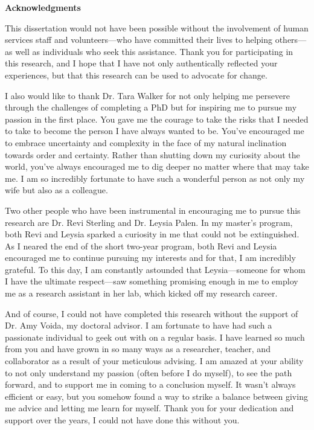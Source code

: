 \documentclass[11pt,openany,oneside]{book}
\begin{document}
\thispagestyle{plain}
{\Large \noindent \textbf{Acknowledgments} \par} \vspace{.5cm}
This dissertation would not have been possible without the involvement of human services staff and volunteers---who have committed their lives to helping others---as well as individuals who seek this assistance. Thank you for participating in this research, and I hope that I have not only authentically reflected your experiences, but that this research can be used to advocate for change.

I also would like to thank Dr. Tara Walker for not only helping me persevere through the challenges of completing a PhD but for inspiring me to pursue my passion in the first place. You gave me the courage to take the risks that I needed to take to become the person I have always wanted to be. You've encouraged me to embrace uncertainty and complexity in the face of my natural inclination towards order and certainty. Rather than shutting down my curiosity about the world, you've always encouraged me to dig deeper no matter where that may take me. I am so incredibly fortunate to have such a wonderful person as not only my wife but also as a colleague.

Two other people who have been instrumental in encouraging me to pursue this research are Dr. Revi Sterling and Dr. Leysia Palen. In my master's program, both Revi and Leysia sparked a curiosity in me that could not be extinguished. As I neared the end of the short two-year program, both Revi and Leysia encouraged me to continue pursuing my interests and for that, I am incredibly grateful. To this day, I am constantly astounded that Leysia---someone for whom I have the ultimate respect---saw something promising enough in me to employ me as a research assistant in her lab, which kicked off my research career.

And of course, I could not have completed this research without the support of Dr. Amy Voida, my doctoral advisor. I am fortunate to have had such a passionate individual to geek out with on a regular basis. I have learned so much from you and have grown in so many ways as a researcher, teacher, and collaborator as a result of your meticulous advising. I am amazed at your ability to not only understand my passion (often before I do myself), to see the path forward, and to support me in coming to a conclusion myself. It wasn't always efficient or easy, but you somehow found a way to strike a balance between giving me advice and letting me learn for myself. Thank you for your dedication and support over the years, I could not have done this without you.
\end{document}
